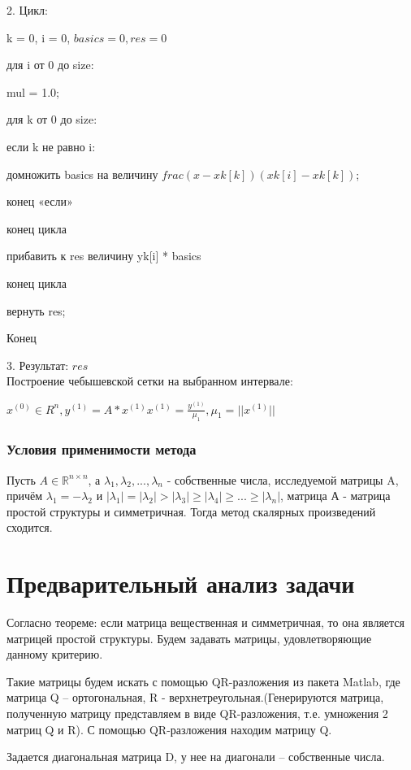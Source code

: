 \documentclass{article}
\begin{document}
	2. Цикл:
	
	k = 0, i = 0, $basics = 0, res = 0$
	
	для i от 0 до size: 
	
	\quad mul = 1.0;
	
	\quad для k от 0 до size:
	
	\qquad если k не равно i:
	
	\quad \qquad домножить basics на величину $frac{(x - xk[k])}{(xk[i]-xk[k])}$;
	
	\qquad конец «если»
	
	\quad конец цикла
	
	\quad прибавить к res величину yk[i] * basics
	
	конец цикла
	
	вернуть res;
	
	
	Конец
	
	3. Результат: $res$
	~\\
	
	Построение чебышевской сетки на выбранном интервале:
	
	$x^{(0)} \in R^n,y^{(1)} = A*x^{(1)} x^{(1)} = \frac{y^{(1)}}{\mu_1}, \mu_1 = ||x^{(1)}||$
	
	
	\subsubsection{Условия применимости метода}
	Пусть $A \in \mathbb{R}^{n \times n}$, а $\lambda_1, \lambda_2,...,\lambda_n$ - собственные числа, исследуемой матрицы A, причём $\lambda_1 = -\lambda_2$ и $|\lambda_1| = |\lambda_2| > |\lambda_3| \geq |\lambda_4| \geq ... \geq |\lambda_n|$, матрица А - матрица простой структуры и симметричная. Тогда метод скалярных произведений сходится.
	
	\section{Предварительный анализ задачи}
	Согласно теореме: если матрица вещественная и симметричная, то она является матрицей простой структуры. Будем задавать матрицы, удовлетворяющие данному критерию.
	
	Такие матрицы будем искать с помощью QR-разложения из пакета Matlab, где матрица Q – ортогональная, R - верхнетреугольная.(Генерируются матрица, полученную матрицу представляем в виде QR-разложения, т.е. умножения 2 матриц Q и R). С помощью QR-разложения находим матрицу Q.
	
	Задается диагональная матрица D, у нее на диагонали – собственные числа. 
	
\end{document}
